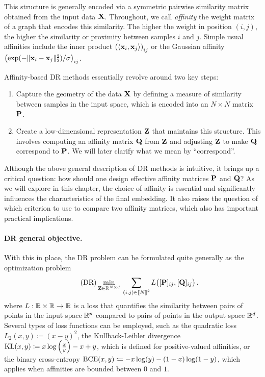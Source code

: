 This structure is generally encoded via a symmetric pairwise similarity matrix obtained from the input data ${\mathbf{X}}$. Throughout, we call \emph{affinity} the weight matrix of a graph that encodes this similarity. The higher the weight in position $(i,j)$, the
higher the similarity or proximity between samples $i$ and $j$. Simple usual affinities include the inner product $\left( \langle {\mathbf{x}}_i, {\mathbf{x}}_j \rangle \right)_{ij}$ or the Gaussian affinity $\left( \exp(-\|{\mathbf{x}}_i - {\mathbf{x}}_j\|_2^2) / \sigma \right)_{ij}$.

Affinity-based DR methods essentially revolve around two key steps:

\begin{enumerate}
    \item Capture the geometry of the data ${\mathbf{X}}$ by defining a measure of similarity between samples in the input space, which is encoded into an $N \times N$ matrix ${\mathbf{P}}$.
    \item Create a low-dimensional representation ${\mathbf{Z}}$ that maintains this structure. This involves computing an affinity matrix ${\mathbf{Q}}$ from ${\mathbf{Z}}$ and adjusting ${\mathbf{Z}}$ to make ${\mathbf{Q}}$ correspond to ${\mathbf{P}}$. We will later clarify what we mean by ``correspond''.
\end{enumerate}

Although the above general description of DR methods is intuitive, it brings up a critical question: how should one design effective affinity matrices ${\mathbf{P}}$ and ${\mathbf{Q}}$? As we will explore in this chapter, the choice of affinity is essential and significantly influences the characteristics of the final embedding. It also raises the question of which criterion to use to compare two affinity matrices, which also has important practical implications.


\paragraph{DR general objective.} With this in place, the DR problem can be formulated quite generally as the optimization problem
\begin{equation}
\label{eq:DR_criterion}\tag{DR}
\min_{{\mathbf{Z}} \in \mathbb{R}^{N \times d}} \: \sum_{(i,j) \in {[\![N]\!]}^2}  L\big([{\mathbf{P}}]_{ij}, [{\mathbf{Q}}]_{ij}\big) \,.
\end{equation}
where $L:\mathbb{R} \times \mathbb{R} \rightarrow \mathbb{R}$ is a loss that quantifies the similarity between pairs of points in the input space $\mathbb{R}^{p}$ compared to pairs of points in the output space $\mathbb{R}^{d}$. Several types of loss functions can be employed, such as the quadratic loss $L_2(x, y) \coloneqq (x - y)^2$, the Kullback-Leibler divergence $\operatorname{KL}(x, y) \coloneqq x \log \left(\frac{x}{y}\right) - x + y$, which is defined for positive-valued affinities, or the binary cross-entropy $\operatorname{BCE}(x, y) \coloneqq -x \log(y) - (1 - x) \log(1 - y)$, which applies when affinities are bounded between $0$ and $1$.

